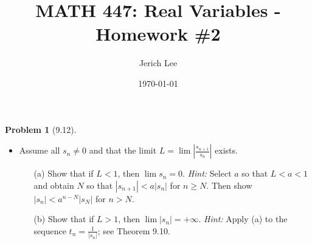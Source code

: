 \documentclass[12pt]{article}
\title{MATH 447: Real Variables - Homework \#2}
\author{Jerich Lee}
\date{\today}
\theoremstyle{definition} %
\newtheorem{problem}{Problem}
\theoremstyle{plain} %
\begin{document}
\maketitle

\begin{problem}[9.12]
    \begin{itemize}
        \item Assume all $s_n \neq 0$ and that the limit $L = \lim \left| \frac{s_{n+1}}{s_n} \right|$ exists.
        \begin{enumerate}
            \item[(a)] Show that if $L < 1$, then $\lim s_n = 0$. \emph{Hint:} Select $a$ so that $L < a < 1$ and obtain $N$ so that $|s_{n+1}| < a|s_n|$ for $n \ge N$. Then show $|s_n| < a^{n-N}|s_N|$ for $n > N$.
            \item[(b)] Show that if $L > 1$, then $\lim |s_n| = +\infty$. \emph{Hint:} Apply (a) to the sequence $t_n = \frac{1}{|s_n|}$; see Theorem 9.10.
        \end{enumerate}
    \end{itemize}
\end{problem}
\end{document}
